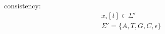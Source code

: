 \documentclass[preview]{standalone}
\begin{document}
\begin{center}
consistency:
            \begin{gather*}
            x_i[t] \in \Sigma '\\
            \Sigma ' = \{A,T,G,C,\epsilon \}
            \end{gather*}
\end{center}
\end{document}
